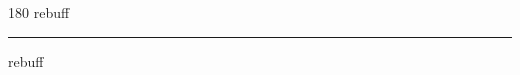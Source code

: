 
\begin{frame}
\begin{center}
\begin{turn}{180}
{\fontsize{2.5cm}{1em}\selectfont rebuff}
\end{turn}
\vspace{1em}\par  
\hrule
\vspace{1em}\par  
{\fontsize{2.5cm}{1em}\selectfont rebuff}
\end{center}
\end{frame}

